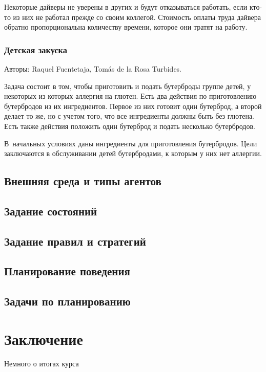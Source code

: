 \documentclass[b5paper,11pt]{book}
\numberwithin{Def}{section}
\numberwithin{Th}{chapter}
\numberwithin{St}{chapter}
\begin{document}
	Некоторые дайверы не уверены в других и будут отказываться работать, если кто-то из них не работал прежде со своим коллегой. Стоимость оплаты труда дайвера обратно пропорциональна количеству времени, которое они тратят на работу. 
	\subsection{Детская закуска}
	Авторы: Raquel Fuentetaja, Tomás de la Rosa Turbides. 
	
	Задача состоит в том, чтобы приготовить и подать бутерброды группе детей, у некоторых из которых аллергия на глютен. Есть два действия по приготовлению бутербродов из их ингредиентов. Первое из них готовит один бутерброд, а второй делает то же, но с учетом того, что все ингредиенты должны быть без глютена. Есть также действия положить один бутерброд и подать несколько бутербродов. 
	
	В~начальных условиях даны ингредиенты для приготовления бутербродов. Цели заключаются в обслуживании детей бутербродами, к которым у них нет аллергии.
	\section{Внешняя среда и типы агентов}
	\section{Задание состояний}
	\section{Задание правил и стратегий}
	\section{Планирование поведения}
	\section{Задачи по планированию}
	
	

	\chapter*{Заключение}
	Немного о итогах курса
	\printbibliography
\end{document}
